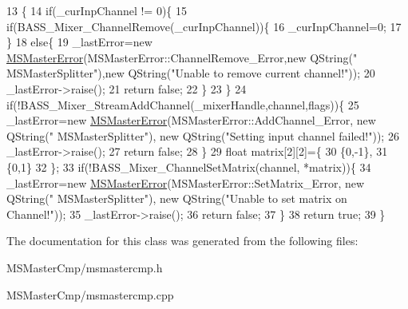 \begin{DoxyCode}
13                                                                 \{
14     \textcolor{keywordflow}{if}(\_curInpChannel != 0)\{
15         \textcolor{keywordflow}{if}(BASS\_Mixer\_ChannelRemove(\_curInpChannel))\{
16             \_curInpChannel=0;
17         \}
18         \textcolor{keywordflow}{else}\{
19             \_lastError=\textcolor{keyword}{new} \hyperlink{class_m_s_master_error}{MSMasterError}(MSMasterError::ChannelRemove\_Error,\textcolor{keyword}{new} QString(\textcolor{stringliteral}{"
      MSMasterSplitter"}),\textcolor{keyword}{new} QString(\textcolor{stringliteral}{"Unable to remove current channel!"}));
20             \_lastError->raise();
21             \textcolor{keywordflow}{return} \textcolor{keyword}{false};
22         \}
23     \}
24     \textcolor{keywordflow}{if}(!BASS\_Mixer\_StreamAddChannel(\_mixerHandle,channel,flags))\{
25         \_lastError=\textcolor{keyword}{new} \hyperlink{class_m_s_master_error}{MSMasterError}(MSMasterError::AddChannel\_Error, \textcolor{keyword}{new} QString(\textcolor{stringliteral}{"
      MSMasterSplitter"}), \textcolor{keyword}{new} QString(\textcolor{stringliteral}{"Setting input channel failed!"}));
26         \_lastError->raise();
27         \textcolor{keywordflow}{return} \textcolor{keyword}{false};
28     \}
29     \textcolor{keywordtype}{float} matrix[2][2]=\{
30         \{0,-1\},
31         \{0,1\}
32     \};
33     \textcolor{keywordflow}{if}(!BASS\_Mixer\_ChannelSetMatrix(channel, *matrix))\{
34         \_lastError=\textcolor{keyword}{new} \hyperlink{class_m_s_master_error}{MSMasterError}(MSMasterError::SetMatrix\_Error, \textcolor{keyword}{new} QString(\textcolor{stringliteral}{"
      MSMasterSplitter"}), \textcolor{keyword}{new} QString(\textcolor{stringliteral}{"Unable to set matrix on Channel!"}));
35         \_lastError->raise();
36         \textcolor{keywordflow}{return} \textcolor{keyword}{false};
37     \}
38     \textcolor{keywordflow}{return} \textcolor{keyword}{true};
39 \}
\end{DoxyCode}


The documentation for this class was generated from the following files\-:\begin{DoxyCompactItemize}
\item 
M\-S\-Master\-Cmp/msmastercmp.\-h\item 
M\-S\-Master\-Cmp/msmastercmp.\-cpp\end{DoxyCompactItemize}
